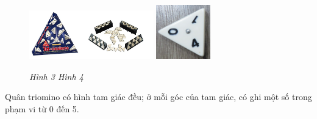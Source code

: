 	\begin{figure}[H]
		\centering
		\vspace*{-5pt}
		\captionsetup{labelformat=empty, justification=centering}
		\includegraphics[width=0.48\textwidth]{dom-07}
		\includegraphics[width=0.21\textwidth]{dom-08}
		\caption{\textit{\small Hình 3 \hspace{90pt}Hình 4}}
		\vspace*{-5pt}
	\end{figure}
	Quân triomino có hình tam giác đều; ở mỗi góc của tam giác, có ghi một số trong phạm vi từ 0 đến 5.
	
